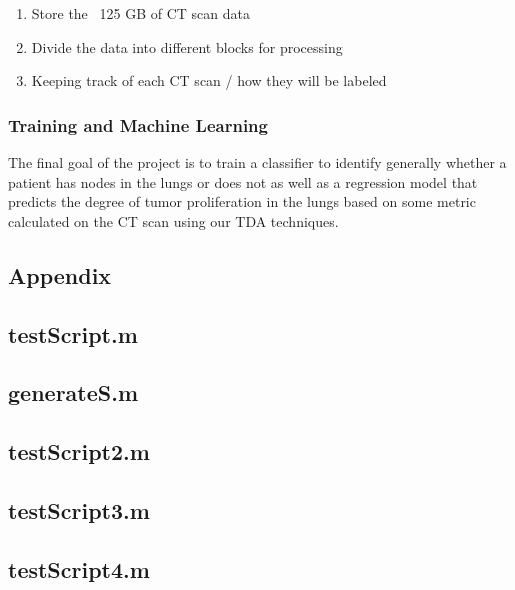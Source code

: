 \documentclass[12pt]{report}
\begin{document}
\begin{enumerate}
	\item Store the ~125 GB of CT scan data
	\item Divide the data into different blocks for processing
	\item Keeping track of each CT scan / how they will be labeled
\end{enumerate}

\subsection{Training and Machine Learning}

The final goal of the project is to train a classifier to identify generally whether a patient has nodes in the lungs or does not as well as a regression model that predicts the degree of tumor proliferation in the lungs based on some metric calculated on the CT scan using our TDA techniques.







\begin{appendices}
\chapter{Appendix}
\section{testScript.m}

\section{generateS.m}

\section{testScript2.m}

\section{testScript3.m}

\section{testScript4.m}

\end{appendices}
\end{document}
